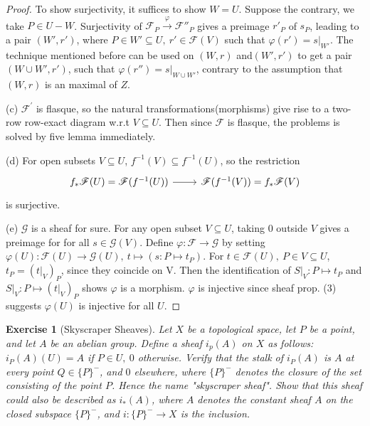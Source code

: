 \documentclass{amsart}
\newtheorem{exe}{Exercise}[subsection]
\theoremstyle{remark}\newtheorem{rmk}[theorem]{Remark}
\begin{document}
\begin{proof}
	To show surjectivity, it suffices to show $W=U$. Suppose the contrary, we take $P\in U-W$. Surjectivity of $\mathscr{F}_P\xrightarrow{\varphi} \mathscr{F}''_P$ gives a preimage $r'_P$ of $s_P$, leading to a pair $(W',r')$, where $P\in W'\subseteq U,\ r'\in \mathscr{F}(V)$ such that $\varphi(r')=s|_{W'}$. The technique mentioned before can be used on $(W,r)$ and$(W',r')$ to get a pair $(W\cup W',r')$, such that $\varphi(r'')=s|_{W\cup W'}$, contrary to the assumption that $(W,r)$ is an maximal of $Z$.
	
	(c) $\mathscr{F}^{'}$ is flasque, so the natural transformations(morphisms) give rise to a two-row row-exact diagram w.r.t $V\subseteq U$. Then since $\mathscr{F}$ is flasque, the problems is solved by five lemma immediately.
	
	(d) For open subsets $V\subseteq U$, $f^{-1}(V)\subseteq f^{-1}(U)$, so the restriction
	\begin{equation*}
		\begin{tikzcd}
			f_{*}\mathscr{F}(U)=\mathscr{F}(f^{-1}(U)) \arrow[r] & \mathscr{F}(f^{-1}(V))=f_*\mathscr{F}(V)
		\end{tikzcd}
	\end{equation*}
	is surjective.
	
	(e) $\mathscr{G}$ is a sheaf for sure. For any open subset $V\subseteq U$, taking $0$ outside $V$ gives a preimage for for all $s \in \mathscr{G}(V)$. Define $\varphi: \mathscr{F}\rightarrow \mathscr{G}$ by setting $\varphi(U): \mathscr{F}(U)\rightarrow \mathscr{G}(U),\ t\mapsto (s: P \mapsto t_P)$. For $t\in \mathscr{F}(U),\ P\in V\subseteq U$, $t_P=(t|_V)_P$, since they coincide on V. Then the identification of $S|_V: P\mapsto t_P$ and $S|_V: P\mapsto (t|_V)_P$ shows $\varphi$ is a morphism. $\varphi$ is injective since sheaf prop. (3) suggests $\varphi(U)$ is injective for all $U$.
\end{proof}

\begin{exe}[Skyscraper Sheaves]
	\label{2.1.17}
	Let $X$ be a topological space, let $P$ be a point, and let $A$ be an abelian group. Define a sheaf $i_p(A)$ on $X$ as follows: $i_P(A)(U)=A$ if $P\in U,\ 0$ otherwise. Verify that the stalk of $i_P(A)$ is $A$ at every point $Q\in \{P\}^-$, and $0$ elsewhere, where $\{P\}^-$ denotes the closure of the set consisting of the point $P$. Hence the name "skyscraper sheaf". Show that this sheaf could also be described as $i_*(A)$, where $A$ denotes the constant sheaf $A$ on the closed subspace $\{P\}^-$, and $i:\{P\}^-\rightarrow X$ is the inclusion.
	
\end{exe}
\end{document}
